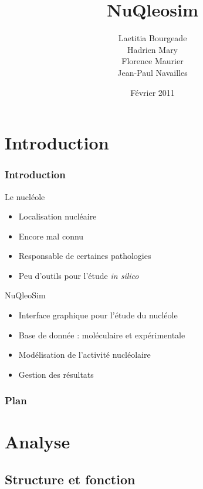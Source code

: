 \documentclass{beamer}
\title[NuQleosim]
{
  NuQleosim
}
\subtitle
{}
\author[Laetitia Bourgeade Hadrien Mary Florence Maurier Jean-Paul Navailles]
{Laetitia Bourgeade \\ Hadrien Mary \\ Florence Maurier \\ Jean-Paul Navailles}
\institute[Universités Bordeaux 1 \& 2]
{
  Universités Bordeaux 1 \& 2
}
\date{Février 2011} %
\begin{document}
\begin{frame}
  \titlepage
\end{frame}

\section*{Introduction}

\begin{frame}
  \frametitle{Introduction}

  \begin{block}{Le nucléole}
    \begin{itemize}
    \item Localisation nucléaire 
    \item Encore mal connu
    \item Responsable de certaines pathologies
    \item Peu d'outils pour l'étude \textit{in silico}
    \end{itemize}
  \end{block}

  \begin{block}{NuQleoSim}
    \begin{itemize}
    \item Interface graphique pour l'étude du nucléole
    \item Base de donnée : moléculaire et expérimentale
    \item Modélisation de l'activité nucléolaire
    \item Gestion des résultats
    \end{itemize}
  \end{block}

\end{frame}

\begin{frame}
  \frametitle{Plan}
  \tableofcontents
\end{frame}

\section{Analyse}

\subsection{Structure et fonction}
\end{document}
